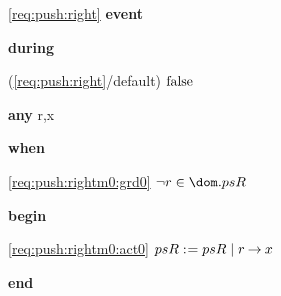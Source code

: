 \noindent \ref{req:push:right}  \textbf{event}
\begin{block}
  \item   \textbf{during}
  \begin{block}
  \item[ (\ref{req:push:right}/default) ]{$\text{false} $} %
  \end{block}
  \item   \textbf{any} r,x
  \item   \textbf{when}
  \begin{block}
  \item[ \eqref{req:push:rightm0:grd0} ]{$\neg r \in \dom.psR $} %
  \end{block}
  \item   \textbf{begin}
  \begin{block}
  \item[ \eqref{req:push:rightm0:act0} ]{$psR \mathrel{:\mkern1mu=} psR \; | \; r \mathbin\rightarrow x $} %
  \end{block}
  \item   \textbf{end} \\
\end{block}
